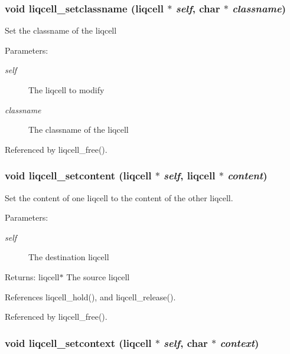 \subsubsection[{liqcell\_\-setclassname}]{\setlength{\rightskip}{0pt plus 5cm}void liqcell\_\-setclassname (liqcell $\ast$ {\em self}, \/  char $\ast$ {\em classname})}\label{d5/da2/liqcell_8c_6559854ce1171311fc2b4c4bee73ba90}


Set the classname of the liqcell \begin{Desc}
\item[Parameters:]
\begin{description}
\item[{\em self}]The liqcell to modify \item[{\em classname}]The classname of the liqcell \end{description}
\end{Desc}


Referenced by liqcell\_\-free().
\subsubsection[{liqcell\_\-setcontent}]{\setlength{\rightskip}{0pt plus 5cm}void liqcell\_\-setcontent (liqcell $\ast$ {\em self}, \/  liqcell $\ast$ {\em content})}\label{d5/da2/liqcell_8c_87311189daa852e6b7c02d3fb507dc00}


Set the content of one liqcell to the content of the other liqcell. \begin{Desc}
\item[Parameters:]
\begin{description}
\item[{\em self}]The destination liqcell \end{description}
\end{Desc}
\begin{Desc}
\item[Returns:]liqcell$\ast$ The source liqcell \end{Desc}


References liqcell\_\-hold(), and liqcell\_\-release().

Referenced by liqcell\_\-free().
\subsubsection[{liqcell\_\-setcontext}]{\setlength{\rightskip}{0pt plus 5cm}void liqcell\_\-setcontext (liqcell $\ast$ {\em self}, \/  char $\ast$ {\em context})}\label{d5/da2/liqcell_8c_ceb981921f6ccaa806687a5bdd66f06a}


